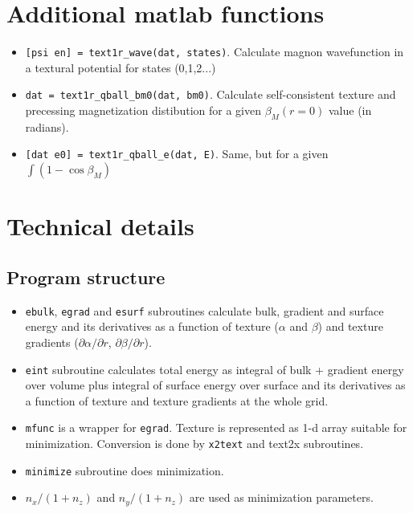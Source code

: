 \documentclass[a4paper]{article}
\begin{document}
\section*{Additional matlab functions}
\begin{itemize}
\item {\tt [psi en] = text1r\_wave(dat, states)}.
 Calculate magnon wavefunction in a textural potential for states (0,1,2...)

\item {\tt dat = text1r\_qball\_bm0(dat, bm0)}.
 Calculate self-consistent texture and precessing magnetization
 distibution for a given $\beta_M(r=0)$ value (in radians).

\item {\tt [dat e0] = text1r\_qball\_e(dat, E)}.
 Same, but for a given $\int (1-\cos\beta_M)$

\end{itemize}

\eject
\section*{Technical details}

\subsection*{Program structure}

\begin{itemize}
\item{\tt ebulk}, {\tt egrad} and {\tt esurf} subroutines calculate
bulk, gradient and surface energy and its derivatives as a function
of texture ($\alpha$ and $\beta$) and texture gradients
($\partial\alpha/\partial r$, $\partial\beta/\partial r$).

\item {\tt eint} subroutine calculates total energy as integral of bulk +
gradient energy over volume plus integral of surface energy over surface
and its derivatives as a function of texture and texture gradients at
the whole grid.

\item {\tt mfunc} is a wrapper for {\tt egrad}. Texture is represented
as 1-d array suitable for minimization. Conversion is done by
{\tt x2text} and {text2x} subroutines.

\item {\tt minimize} subroutine does minimization.

\item $n_x/(1+n_z)$ and $n_y/(1+n_z)$ are used as minimization parameters.

\end{itemize}
\end{document}
